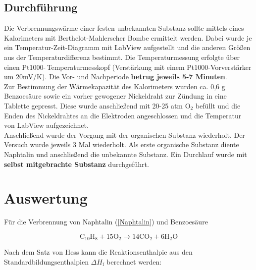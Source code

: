 \documentclass[12pt,a4paper,titlepage,headinclude,bibtotoc]{scrartcl}
\begin{document}
\subsection{Durchführung}
Die Verbrennungswärme einer festen unbekannten Substanz sollte mittels eines Kalorimeters mit Berthelot-Mahlerscher Bombe ermittelt werden.
Dabei wurde je ein Temperatur-Zeit-Diagramm mit LabView aufgestellt und die anderen Größen aus der Temperaturdifferenz bestimmt. Die Temperaturmessung erfolgte über einen Pt1000-\,Temperaturmesskopf (Verstärkung mit einem Pt1000-Vorverstärker um 20mV/K). Die Vor- und Nachperiode \textbf{betrug jeweils 5-7 Minuten}.\\
Zur Bestimmung der Wärmekapazität des Kalorimeters wurden ca. 0,6 g Benzoesäure sowie ein vorher gewogener Nickeldraht zur Zündung in eine Tablette gepresst. Diese wurde anschließend mit 20-25 atm O$_2$ befüllt und die Enden des Nickeldrahtes an die Elektroden angeschlossen und die Temperatur von LabView aufgezeichnet.\\
Anschließend wurde der Vorgang mit der organischen Substanz wiederholt. Der Versuch wurde jeweils 3 Mal wiederholt. Als erste organische Substanz diente Naphtalin und anschließend die unbekannte Substanz. Ein Durchlauf wurde mit \textbf{selbst mitgebrachte Substanz} durchgeführt.\\

\section{Auswertung}

Für die Verbrennung von Naphtalin (\ref{Naphtalin}) und Benzoesäure %



\begin{equation}\label{Naphtalin}
\mathrm{C}_{10}\mathrm{H}_8 + 15\mathrm{O}_2 \rightarrow 14 \mathrm{CO}_2 + 6\mathrm{H}_2\mathrm{O}
\end{equation}

Nach dem Satz von Hess kann die Reaktionsenthalpie aus den Standardbildungsenthalpien $\Delta H_\mathrm{f}$ berechnet werden:\\
\end{document}
